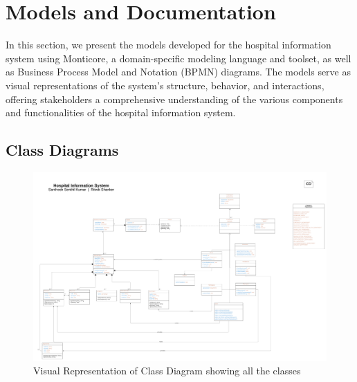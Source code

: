 \chapter{Models and Documentation}\label{ch:listings}


In this section, we present the models developed for the hospital information system using Monticore, a domain-specific modeling language and toolset, as well as Business Process Model and Notation (BPMN) diagrams. The models serve as visual representations of the system's structure, behavior, and interactions, offering stakeholders a comprehensive understanding of the various components and functionalities of the hospital information system.

\section{Class Diagrams}

\begin{figure}[htbp]
  \centering
  \includegraphics[width=\textwidth,height=\textheight,keepaspectratio]{src/pic/UML class.png}
  \caption{Visual Representation of Class Diagram showing all the classes}
  \label{fig:fullscreen}
\end{figure}



